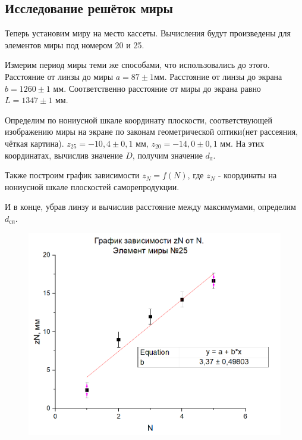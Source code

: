 \documentclass[a4paper,12pt]{article}
\begin{document}
\subsection*{Исследование решёток миры}
Теперь установим миру на место кассеты. Вычисления будут произведены для элементов миры под номером 20 и 25. 

Измерим период миры теми же способами, что использовались до этого. Расстояние от линзы до миры $a = 87 \pm 1 $мм. Расстояние от линзы до экрана $b = 1260 \pm 1$ мм. Соответственно расстояние от миры до экрана равно $L = 1347 \pm 1$ мм.

Определим по нониусной шкале координату плоскости, соответствующей изображению миры на экране по законам геометрической оптики(нет рассеяния, чёткая картина). $z_{25} = -10,4 \pm 0,1$ мм, $z_{20} = -14,0 \pm 0,1$ мм. На этих координатах, вычислив значение $D$, получим значение $d_\text{л}$.

Также построим график зависимости $z_N = f(N)$, где $z_N$ - координаты на нониусной шкале плоскостей саморепродукции.

И в конце, убрав линзу и вычислив расстояние между максимумами, определим $d_\text{сп}$.

\begin{figure}[H]
\centering
\includegraphics[scale=0.65]{graph4.png}
\end{figure}
\end{document}
